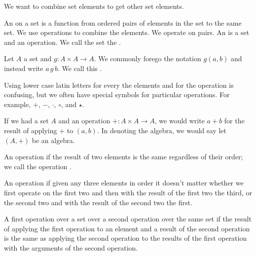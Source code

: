 
\sbasic





\sstart
{}


We want to combine set elements to get
other set elements.



An  on a set is
a function from ordered pairs of elements
in the set to the same set.
We use operations to combine the elements.
We operate on pairs.
An  is a set and
an operation.
We call the set the
.



Let $A$ a set and $g: A \times A \to A$.
We commonly forego the notation $g(a, b)$ and instead write $a\,g\,b$.
We call this .

Using lower case latin letters for every the elements and for the operation is confusing, but we often have special symbols for particular operations.
For example,
$+$, $-$, $\cdot$, $\circ$, and $\star$.

If we had a set $A$ and an operation $+: A \times A \to A$, we would write $a+b$ for the result of applying $+$ to $(a,b)$.
In denoting the algebra, we would say let $(A, +)$ be an algebra.


An operation  if
the result of two elements is the same
regardless of their order; we call the
operation .

An operation 
if given any three elements in order it
doesn't matter whether we first operate
on the first two and then with the result
of the first two the third, or the second
two and with the result of the second two
the first.

A first operation over a set
over a second operation over the same set
if the result of applying the first
operation to an element and a result of
the second operation is the same as
applying the second operation to the results
of the first operation with the arguments
of the second operation.


